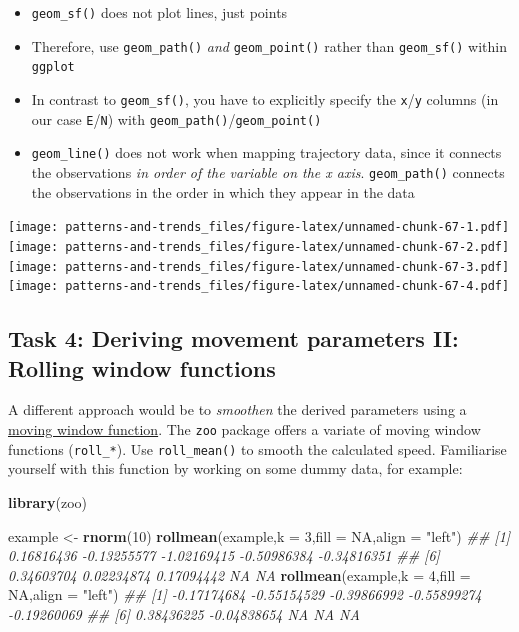 \documentclass[]{book}
\newenvironment{Shaded}{\begin{snugshade}}{\end{snugshade}}
\newcommand{\CommentTok}[1]{\textcolor[rgb]{0.56,0.35,0.01}{\textit{#1}}}
\newcommand{\DataTypeTok}[1]{\textcolor[rgb]{0.13,0.29,0.53}{#1}}
\newcommand{\DecValTok}[1]{\textcolor[rgb]{0.00,0.00,0.81}{#1}}
\newcommand{\KeywordTok}[1]{\textcolor[rgb]{0.13,0.29,0.53}{\textbf{#1}}}
\newcommand{\NormalTok}[1]{#1}
\newcommand{\OtherTok}[1]{\textcolor[rgb]{0.56,0.35,0.01}{#1}}
\newcommand{\StringTok}[1]{\textcolor[rgb]{0.31,0.60,0.02}{#1}}
\providecommand{\tightlist}{%
  \setlength{\itemsep}{0pt}\setlength{\parskip}{0pt}}
\begin{document}
\begin{itemize}
\tightlist
\item
  \texttt{geom\_sf()} does not plot lines, just points
\item
  Therefore, use \texttt{geom\_path()} \emph{and} \texttt{geom\_point()} rather than \texttt{geom\_sf()} within \texttt{ggplot}
\item
  In contrast to \texttt{geom\_sf()}, you have to explicitly specify the \texttt{x}/\texttt{y} columns (in our case \texttt{E}/\texttt{N}) with \texttt{geom\_path()}/\texttt{geom\_point()}
\item
  \texttt{geom\_line()} does not work when mapping trajectory data, since it connects the observations \emph{in order of the variable on the x axis}. \texttt{geom\_path()} connects the observations in the order in which they appear in the data
\end{itemize}

\texttt{[image: patterns-and-trends\_files/figure-latex/unnamed-chunk-67-1.pdf]} \texttt{[image: patterns-and-trends\_files/figure-latex/unnamed-chunk-67-2.pdf]} \texttt{[image: patterns-and-trends\_files/figure-latex/unnamed-chunk-67-3.pdf]} \texttt{[image: patterns-and-trends\_files/figure-latex/unnamed-chunk-67-4.pdf]}

\hypertarget{task-4-deriving-movement-parameters-ii-rolling-window-functions}{%
\subsection{Task 4: Deriving movement parameters II: Rolling window functions}\label{task-4-deriving-movement-parameters-ii-rolling-window-functions}}

A different approach would be to \emph{smoothen} the derived parameters using a \href{https://docs.wavefront.com/images/5sec_moving_window.png}{moving window function}. The \texttt{zoo} package offers a variate of moving window functions (\texttt{roll\_*}). Use \texttt{roll\_mean()} to smooth the calculated speed. Familiarise yourself with this function by working on some dummy data, for example:

\begin{Shaded}
\begin{Highlighting}[]
\KeywordTok{library}\NormalTok{(zoo)}

\NormalTok{example <-}\StringTok{ }\KeywordTok{rnorm}\NormalTok{(}\DecValTok{10}\NormalTok{)}
\KeywordTok{rollmean}\NormalTok{(example,}\DataTypeTok{k =} \DecValTok{3}\NormalTok{,}\DataTypeTok{fill =} \OtherTok{NA}\NormalTok{,}\DataTypeTok{align =} \StringTok{"left"}\NormalTok{)}
\CommentTok{##  [1]  0.16816436 -0.13255577 -1.02169415 -0.50986384 -0.34816351}
\CommentTok{##  [6]  0.34603704  0.02234874  0.17094442          NA          NA}
\KeywordTok{rollmean}\NormalTok{(example,}\DataTypeTok{k =} \DecValTok{4}\NormalTok{,}\DataTypeTok{fill =} \OtherTok{NA}\NormalTok{,}\DataTypeTok{align =} \StringTok{"left"}\NormalTok{)}
\CommentTok{##  [1] -0.17174684 -0.55154529 -0.39866992 -0.55899274 -0.19260069}
\CommentTok{##  [6]  0.38436225 -0.04838654          NA          NA          NA}
\end{Highlighting}
\end{Shaded}
\end{document}
